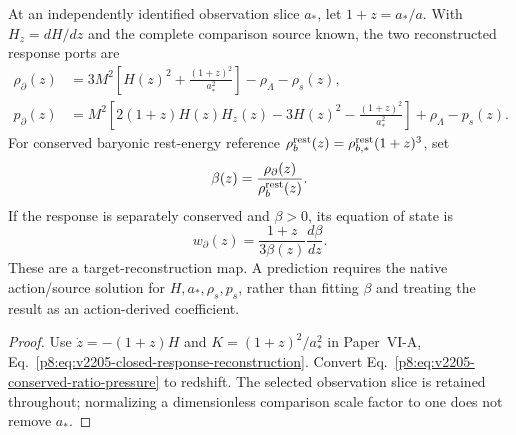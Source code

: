 \documentclass[12pt,a4paper]{article}
\begin{document}
\begin{proposition}
\label{p9:prop:v2205-redshift-response-map}
At an independently identified observation slice $a_*$, let
$1+z=a_*/a$. With $H_z=dH/dz$ and the complete comparison source known,
the two reconstructed response ports are
\begin{align}
\label{p9:eq:v2205-redshift-response-map}
 \rho_\partial(z)&=3M^2\left[H(z)^2+
                      \frac{(1+z)^2}{a_*^2}\right]
                         -\rho_\Lambda-\rho_s(z),\\
 p_\partial(z)&=M^2\left[2(1+z)H(z)H_z(z)-3H(z)^2
                      -\frac{(1+z)^2}{a_*^2}\right]
                         +\rho_\Lambda-p_s(z).\nonumber
\end{align}
For conserved baryonic rest-energy reference
$\rho_b^{\rm rest}(z)=\rho_{b,*}^{\rm rest}(1+z)^3$, set
\[
 \beta(z)=\frac{\rho_\partial(z)}{\rho_b^{\rm rest}(z)}.
\]
If the response is separately conserved and $\beta>0$, its equation of
state is
\begin{equation}
\label{p9:eq:v2205-redshift-ratio-pressure}
 \boxed{w_\partial(z)=\frac{1+z}{3\beta(z)}\frac{d\beta}{dz}.}
\end{equation}
These are a target-reconstruction map. A prediction requires the native
action/source solution for $H,a_*,\rho_s,p_s$, rather than fitting
$\beta$ and treating the result as an action-derived coefficient.
\end{proposition}
\begin{proof}
Use $\dot z=-(1+z)H$ and $K=(1+z)^2/a_*^2$ in
Paper~VI-A, Eq.~\eqref{p8:eq:v2205-closed-response-reconstruction}.
Convert Eq.~\eqref{p8:eq:v2205-conserved-ratio-pressure} to redshift.
The selected observation slice is retained throughout; normalizing a
dimensionless comparison scale factor to one does not remove $a_*$.
\end{proof}
\end{document}
